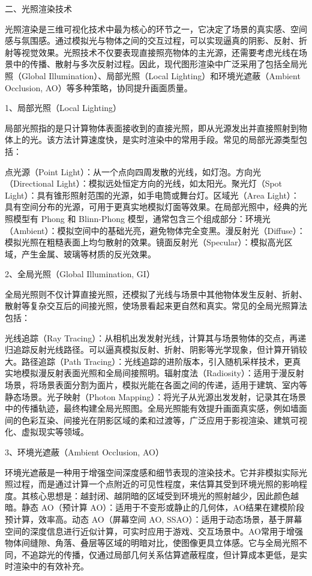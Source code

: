 
二、光照渲染技术

光照渲染是三维可视化技术中最为核心的环节之一，它决定了场景的真实感、空间感与氛围感。通过模拟光与物体之间的交互过程，可以实现逼真的阴影、反射、折射等视觉效果。光照技术不仅要表现直接照亮物体的主光源，还需要考虑光线在场景中的传播、散射与多次反射过程。因此，现代图形渲染中广泛采用了包括全局光照（Global Illumination）、局部光照（Local Lighting）和环境光遮蔽（Ambient Occlusion, AO）等多种策略，协同提升画面质量。

1、局部光照（Local Lighting）

局部光照指的是只计算物体表面接收到的直接光照，即从光源发出并直接照射到物体上的光。该方法计算速度快，是实时渲染中的常用手段。常见的局部光源类型包括：

点光源（Point Light）：从一个点向四周发散的光线，如灯泡。方向光（Directional Light）：模拟远处恒定方向的光线，如太阳光。聚光灯（Spot Light）：具有锥形照射范围的光源，如手电筒或舞台灯。区域光（Area Light）：具有空间分布的光源，可用于更真实地模拟灯面等效果。在局部光照中，经典的光照模型有 Phong 和 Blinn-Phong 模型，通常包含三个组成部分：环境光（Ambient）：模拟空间中的基础光亮，避免物体完全变黑。漫反射光（Diffuse）：模拟光照在粗糙表面上均匀散射的效果。镜面反射光（Specular）：模拟高光区域，产生金属、玻璃等材质的反光效果。

2、全局光照（Global Illumination, GI）

全局光照则不仅计算直接光照，还模拟了光线与场景中其他物体发生反射、折射、散射等复杂交互后的间接光照，使场景看起来更自然和真实。常见的全局光照算法包括：

光线追踪（Ray Tracing）：从相机出发发射光线，计算其与场景物体的交点，再递归追踪反射光线路径。可以逼真模拟反射、折射、阴影等光学现象，但计算开销较大。路径追踪（Path Tracing）：光线追踪的进阶版本，引入随机采样技术，更真实地模拟漫反射表面光照和全局间接照明。辐射度法（Radiosity）：适用于漫反射场景，将场景表面分割为面片，模拟光能在各面之间的传递，适用于建筑、室内等静态场景。光子映射（Photon Mapping）：将光子从光源出发发射，记录其在场景中的传播轨迹，最终构建全局光照图。全局光照能有效提升画面真实感，例如墙面间的色彩互染、间接光在阴影区域的柔和过渡等，广泛应用于影视渲染、建筑可视化、虚拟现实等领域。

3、环境光遮蔽（Ambient Occlusion, AO）

环境光遮蔽是一种用于增强空间深度感和细节表现的渲染技术。它并非模拟实际光照过程，而是通过计算一个点附近的可见性程度，来估算其受到环境光照的影响程度。其核心思想是：越封闭、越阴暗的区域受到环境光的照射越少，因此颜色越暗。静态 AO（预计算 AO）：适用于不变形或静止的几何体，AO结果在建模阶段预计算，效率高。动态 AO（屏幕空间 AO, SSAO）：适用于动态场景，基于屏幕空间的深度信息进行近似计算，可实时应用于游戏、交互场景中。AO常用于增强物体间缝隙、角落、叠层等区域的明暗对比，使图像更具立体感。它与全局光照不同，不追踪光的传播，仅通过局部几何关系估算遮蔽程度，但计算成本更低，是实时渲染中的有效补充。


